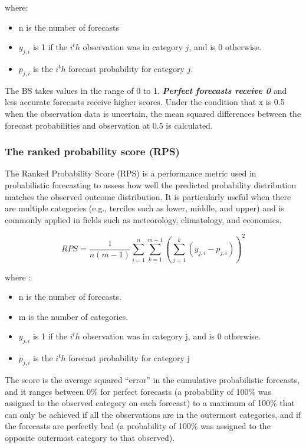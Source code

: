where:
\begin{itemize}
	\item n is the number of forecasts
	\item $y_{j,i} $ is 1 if the $i^th$ observation was in category $j$, and is 0 otherwise.
	\item $p_{j,i}$  is the $i^th$ forecast probability for category $j$.
\end{itemize}
The BS takes values in the range of 0 to 1. \textbf{\textit{Perfect forecasts receive 0}} and less accurate forecasts receive higher scores. Under the condition that x is 0.5 when the observation data is uncertain, the mean squared differences between the forecast probabilities and observation at 0.5 is calculated.








\subsubsection{The ranked probability score (RPS)}

The Ranked Probability Score (RPS) is a performance metric used in probabilistic forecasting to assess how well the predicted probability distribution matches the observed outcome distribution. It is particularly useful when there are multiple categories (e.g., terciles such as lower, middle, and upper) and is commonly applied in fields such as meteorology, climatology, and economics.

$$RPS=\frac{1}{n(m-1)}\sum\limits_{i=1}^{n} \sum\limits_{k=1}^{m-1} \left(\sum\limits_{j=1}^{k}(y_{j,i} - p_{j,i})\right)^2  $$

where : 

\begin{itemize}
	\item n is the number of forecasts.
	\item m is the number of categories.
	\item $y_{j,i}$ is 1 if the $i^th$ observation was in category j, and is 0 otherwise.
	\item $p_{j,i}$ is the $i^th$ forecast probability for category j
\end{itemize}

The score is the average squared “error” in the cumulative
probabilistic forecasts, and it ranges between 0\% for perfect forecasts (a probability of 100\%
was assigned to the observed category on each forecast) to a maximum of 100\% that can only
be achieved if all the observations are in the outermost categories, and if the forecasts are
perfectly bad (a probability of 100\% was assigned to the opposite outermost category to that
observed).




